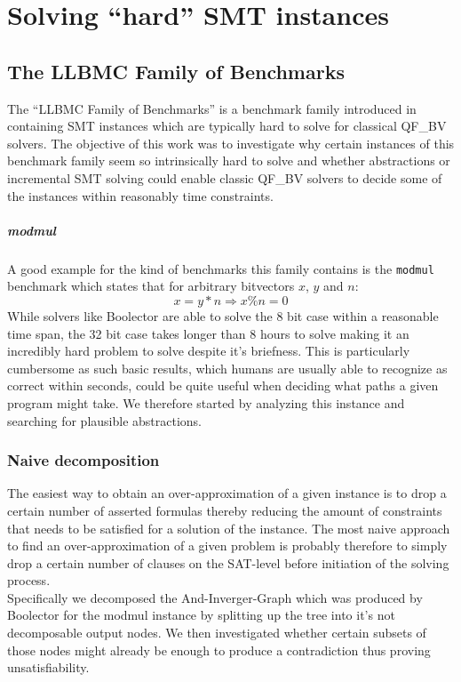 \chapter{Solving \enquote{hard} SMT instances}
\label{ch:solving_hard_smt}
\section{The LLBMC Family of Benchmarks}
\label{sec:solving_hard_smt:llbmc_benchmarks}
The \enquote{LLBMC Family of Benchmarks} is a benchmark family introduced in \cite{sc2017-proceedings} containing SMT instances which are typically hard to solve for classical QF\_BV solvers. The objective of this work was to investigate why certain instances of this benchmark family seem so intrinsically hard to solve and whether abstractions or incremental SMT solving could enable classic QF\_BV solvers to decide some of the instances within reasonably time constraints.

\paragraph{modmul}
A good example for the kind of benchmarks this family contains is the \texttt{modmul} benchmark which states that for arbitrary bitvectors $x$, $y$ and $n$:
\[
x = y*n \Rightarrow x\%n = 0
\]
While solvers like Boolector are able to solve the 8 bit case within a reasonable time span, the 32 bit case takes longer than 8 hours to solve making it an incredibly hard problem to solve despite it's briefness. This is particularly cumbersome as such basic results, which humans are usually able to recognize as correct within seconds, could be quite useful when deciding what paths a given program might take. We therefore started by analyzing this instance and searching for plausible abstractions.

\subsection{Naive decomposition}
The easiest way to obtain an over-approximation of a given instance is to drop a certain number of asserted formulas thereby reducing the amount of constraints that needs to be satisfied for a solution of the instance. The most naive approach to find an over-approximation of a given problem is probably therefore to simply drop a certain number of clauses on the SAT-level before initiation of the solving process.\\
Specifically we decomposed the And-Inverger-Graph which was produced by Boolector for the modmul instance by splitting up the tree into it's not decomposable output nodes. We then investigated whether certain subsets of those nodes might already be enough to produce a contradiction thus proving unsatisfiability.